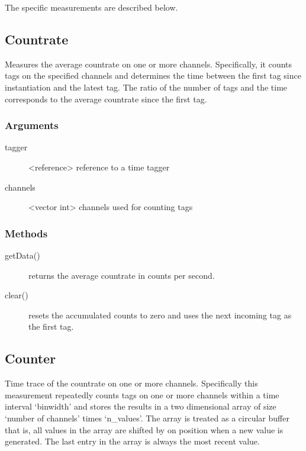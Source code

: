 \documentclass[letterpaper,10pt,english]{sphinxmanual}
\begin{document}
The specific measurements are described below.


\subsection{Countrate}
\label{sections/api:countrate}
Measures the average countrate on one or more channels. Specifically, it
counts tags on the specified channels and determines the time between the first tag since
instantiation and the latest tag. The ratio of the number of tags and the
time corresponds to the average countrate since the first tag.


\subsubsection{Arguments}
\label{sections/api:arguments}\begin{description}
\item[{tagger}] \leavevmode
\textless{}reference\textgreater{} reference to a time tagger

\item[{channels}] \leavevmode
\textless{}vector int\textgreater{} channels used for counting tags

\end{description}


\subsubsection{Methods}
\label{sections/api:id1}\begin{description}
\item[{getData()}] \leavevmode
returns the average countrate in counts per second.

\item[{clear()}] \leavevmode
resets the accumulated counts to zero and uses the next incoming tag as the first tag.

\end{description}


\subsection{Counter}
\label{sections/api:counter}
Time trace of the countrate on one or more channels. Specifically
this measurement repeatedly counts tags on one or more channels within a
time interval `binwidth' and stores the results in a two dimensional array of size
`number of channels' times `n\_values'. The array is treated as a circular buffer that is,
all values in the array are shifted by on position when a new value is generated. The
last entry in the array is always the most recent value.
\end{document}
